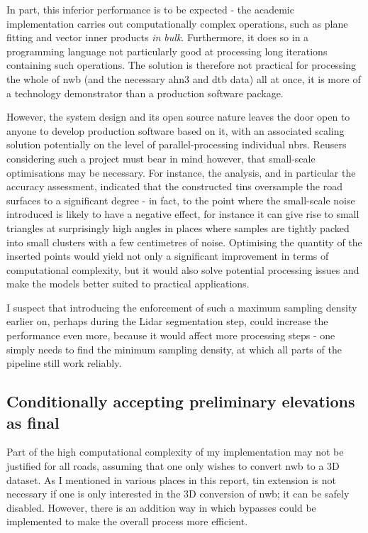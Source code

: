 In part, this inferior performance is to be expected - the academic implementation carries out computationally complex operations, such as plane fitting and vector inner products \textit{in bulk}. Furthermore, it does so in a programming language not particularly good at processing long iterations containing such operations. The solution is therefore not practical for processing the whole of \ac{nwb} (and the necessary \ac{ahn3} and \ac{dtb} data) all at once, it is more of a technology demonstrator than a production software package.

However, the system design and its open source nature leaves the door open to anyone to develop production software based on it, with an associated scaling solution potentially on the level of parallel-processing individual \ac{nbrs}. Reusers considering such a project must bear in mind however, that small-scale optimisations may be necessary. For instance, the analysis, and in particular the accuracy assessment, indicated that the constructed \ac{tin}s oversample the road surfaces to a significant degree - in fact, to the point where the small-scale noise introduced is likely to have a negative effect, for instance it can give rise to small triangles at surprisingly high angles in places where samples are tightly packed into small clusters with a few centimetres of noise. Optimising the quantity of the inserted points would yield not only a significant improvement in terms of computational complexity, but it would also solve potential processing issues and make the models better suited to practical applications.

I suspect that introducing the enforcement of such a maximum sampling density earlier on, perhaps during the Lidar segmentation step, could increase the performance even more, because it would affect more processing steps - one simply needs to find the minimum sampling density, at which all parts of the pipeline still work reliably.

\subsection{Conditionally accepting preliminary elevations as final}
\label{sub:preliminaryelevationsasfinal}

Part of the high computational complexity of my implementation may not be justified for all roads, assuming that one only wishes to convert \ac{nwb} to a 3D dataset. As I mentioned in various places in this report, \ac{tin} extension is not necessary if one is only interested in the 3D conversion of \ac{nwb}; it can be safely disabled. However, there is an addition way in which bypasses could be implemented to make the overall process more efficient.

